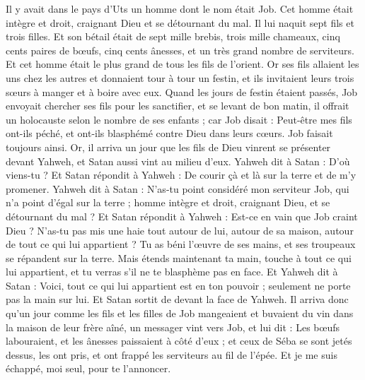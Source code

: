 \begin{multicols}{2}
\VerseOne{}Il y avait dans le pays d'Uts un homme dont le nom était Job. Cet homme était intègre et droit, craignant Dieu et se détournant du mal.
Il lui naquit sept fils et trois filles.
Et son bétail était de sept mille brebis, trois mille chameaux, cinq cents paires de bœufs, cinq cents ânesses, et un très grand nombre de serviteurs. Et cet homme était le plus grand de tous les fils de l'orient.
Or ses fils allaient les uns chez les autres et donnaient tour à tour un festin, et ils invitaient leurs trois sœurs à manger et à boire avec eux.
Quand les jours de festin étaient passés, Job envoyait chercher ses fils pour les sanctifier, et se levant de bon matin, il offrait un holocauste selon le nombre de ses enfants ; car Job disait : Peut-être mes fils ont-ils péché, et ont-ils blasphémé contre Dieu dans leurs cœurs. Job faisait toujours ainsi.
Or, il arriva un jour que les fils de Dieu vinrent se présenter devant Yahweh, et Satan aussi vint au milieu d’eux.
Yahweh dit à Satan : D'où viens-tu ? Et Satan répondit à Yahweh : De courir çà et là sur la terre et de m'y promener.
Yahweh dit à Satan : N'as-tu point considéré mon serviteur Job, qui n'a point d'égal sur la terre ; homme intègre et droit, craignant Dieu, et se détournant du mal ?
Et Satan répondit à Yahweh : Est-ce en vain que Job craint Dieu ?
N'as-tu pas mis une haie  tout autour de lui, autour de sa maison, autour de tout ce qui lui appartient ? Tu as béni l'œuvre de ses mains, et ses troupeaux se répandent sur la terre.
Mais étends maintenant ta main, touche à tout ce qui lui appartient, et tu verras s’il ne te blasphème pas en face.
Et Yahweh dit à Satan : Voici, tout ce qui lui appartient est en ton pouvoir ; seulement ne porte pas la main sur lui. Et Satan sortit de devant la face de Yahweh.
Il arriva donc qu'un jour comme les fils et les filles de Job mangeaient et buvaient du vin dans la maison de leur frère aîné, un messager vint vers Job,
et lui dit : Les bœufs labouraient, et les ânesses paissaient à côté d'eux ;
et ceux de Séba se sont jetés dessus, les ont pris, et ont frappé les serviteurs au fil de l'épée. Et je me suis échappé, moi seul, pour te l'annoncer.

\end{multicols}
